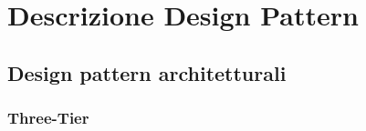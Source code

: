 %




\section{Descrizione Design Pattern} %
\label{sec:descdp}
	\subsection{Design pattern architetturali} %

		\subsubsection{Three-Tier} %

